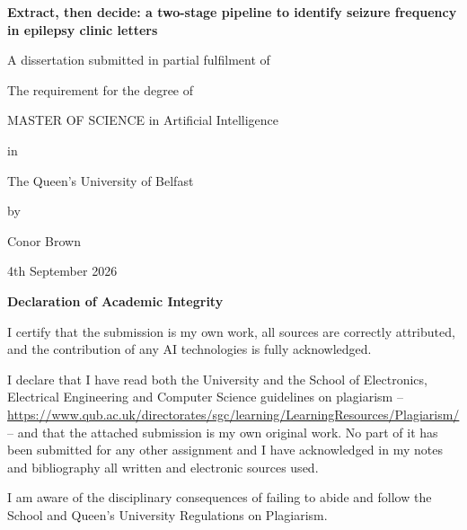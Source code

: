 \documentclass[conference]{IEEEtran}
\begin{document}
\begin{titlepage}
    \centering

    {\Huge\bfseries Extract, then decide: a two-stage pipeline to identify seizure frequency in epilepsy clinic letters \par}
    \vspace{5cm}

    {\large
    A dissertation submitted in partial fulfilment of\par
    The requirement for the degree of\par
    MASTER OF SCIENCE in Artificial Intelligence\par
    in\par
    \par
    The Queen’s University of Belfast\par
    by\par
    Conor Brown\par
    4th September 2026
    }
\end{titlepage}

\onecolumn
\thispagestyle{empty}

\begin{center}
{\Large\bfseries Declaration of Academic Integrity}
\end{center}

\vspace{8pt}

\noindent
I certify that the submission is my own work, all sources are
correctly attributed, and the contribution of any AI technologies
is fully acknowledged.

\vspace{6pt}

\noindent
I declare that I have read both the University and the School of
Electronics, Electrical Engineering and Computer Science guidelines
on plagiarism --
\url{https://www.qub.ac.uk/directorates/sgc/learning/LearningResources/Plagiarism/}
-- and that the attached submission is my own original work. No part
of it has been submitted for any other assignment and I have
acknowledged in my notes and bibliography all written and electronic
sources used.

\vspace{6pt}

\noindent
I am aware of the disciplinary consequences of failing to abide and
follow the School and Queen's University Regulations on Plagiarism.

\vspace{18pt}
\end{document}

